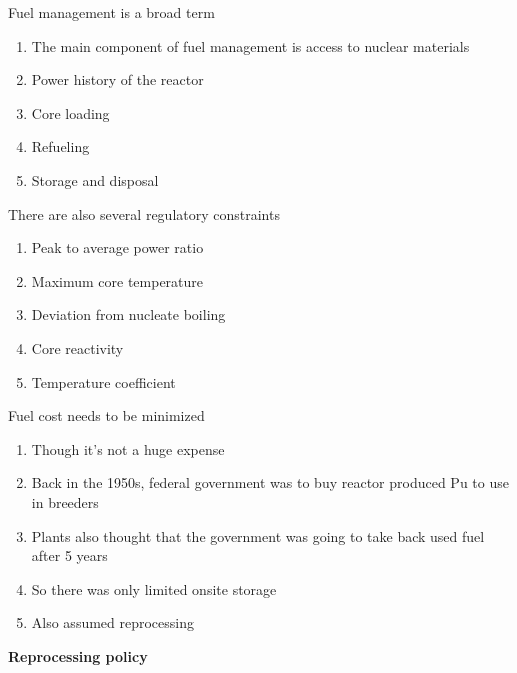 \documentclass[aspectratio=1610,pdftex,dvipsnames,compress,xcolor={dvipsnames}]{beamer}
\begin{document}
\addtocounter{framenumber}{-1} 
\begin{frame}{Fuel management is a broad term}
    \begin{enumerate}[series=outerlist,topsep=0pt,itemsep=15pt,leftmargin=*,label=(\arabic*)]
        \item[]The main component of fuel management is access to nuclear materials
        \item[]Power history of the reactor
        \item[]Core loading
        \item[]Refueling
        \item[]Storage and disposal
    \end{enumerate}
\end{frame}


\begin{frame}{There are also several regulatory constraints}
    \begin{enumerate}[topsep=0pt,itemsep=21pt,leftmargin=*,label=(\arabic*)]
        \item[]Peak to average power ratio
        \item[]Maximum core temperature
        \item[]Deviation from nucleate boiling
        \item[]Core reactivity
        \item[]Temperature coefficient 
    \end{enumerate}
\end{frame}


\begin{frame}{Fuel cost needs to be minimized}
    \begin{enumerate}[series=outerlist,topsep=0pt,itemsep=21pt,leftmargin=*,label=(\arabic*)]
        \item[]Though it's not a huge expense
        \item[]Back in the 1950s, federal government was to buy reactor produced Pu to use in breeders
        \item[]Plants also thought that the government was going to take back used fuel after 5 years
        \item[]So there was only limited onsite storage
        \item[]Also assumed reprocessing
    \end{enumerate}
\end{frame}


\begin{frame}[plain]{}
    \centering\LARGE\textbf{Reprocessing policy}
\end{frame}
\end{document}
